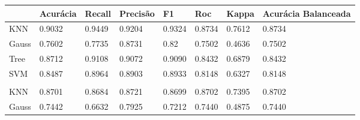 \begin{table}[h]
	\begin{tabular}{|l|l|l|l|l|l|l|l|}
		\hline
		\cellcolor[HTML]{000000}{\color[HTML]{FFFFFF} Cru}        & Acurácia                       & Recall                         & Precisão                       & F1                             & Roc                            & Kappa                          & Acurácia Balanceada            \\ \hline
		KNN                                                       & \cellcolor[HTML]{32CB00}0.9032 & \cellcolor[HTML]{32CB00}0.9449 & \cellcolor[HTML]{32CB00}0.9204 & \cellcolor[HTML]{32CB00}0.9324 & \cellcolor[HTML]{32CB00}0.8734 & \cellcolor[HTML]{32CB00}0.7612 & \cellcolor[HTML]{32CB00}0.8734 \\ \hline
		Gauss                                                     & 0.7602                         & 0.7735                         & 0.8731                         & 0.82                           & 0.7502                         & 0.4636                         & 0.7502                         \\ \hline
		Tree                                                      & 0.8712                         & 0.9108                         & 0.9072                         & 0.9090                         & 0.8432                         & 0.6879                         & 0.8432                         \\ \hline
		SVM                                                       & 0.8487                         & 0.8964                         & 0.8903                         & 0.8933                         & 0.8148                         & 0.6327                         & 0.8148                         \\ \hline
		\cellcolor[HTML]{000000}{\color[HTML]{FFFFFF} Balanceado} &                                &                                &                                &                                &                                &                                &                                \\ \hline
		KNN                                                       & 0.8701                         & 0.8684                         & 0.8721                         & 0.8699                         & 0.8702                         & 0.7395                         & 0.8702                         \\ \hline
		Gauss                                                     & \cellcolor[HTML]{CB0000}0.7442 & \cellcolor[HTML]{CB0000}0.6632 & \cellcolor[HTML]{CB0000}0.7925 & \cellcolor[HTML]{CB0000}0.7212 & 0.7440                         & 0.4875                         & 0.7440                         \\ \hline

\end{tabular}
\end{table}
